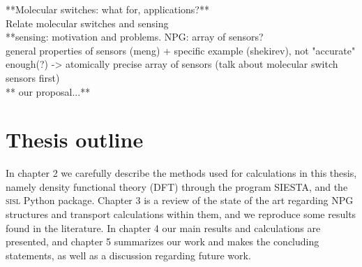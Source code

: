 **Molecular switches: what for, applications?**\\


Relate molecular switches and sensing\\

**sensing: motivation and problems. NPG: array of sensors?\\
general properties of sensors (meng) + specific example (shekirev), not "accurate" enough(?) -> atomically precise array of sensors (talk about molecular switch sensors first)\\
%
** our proposal...**\\

\section{Thesis outline}

In chapter 2 we carefully describe the methods used for calculations in this thesis, namely density functional theory (DFT) through the program SIESTA, and the \textsc{sisl} Python package. Chapter 3 is a review of the state of the art regarding NPG structures and transport calculations within them, and we reproduce some results found in the literature. In chapter 4 our main results and calculations are presented, and chapter 5 summarizes our work and makes the concluding statements, as well as a discussion regarding future work.


